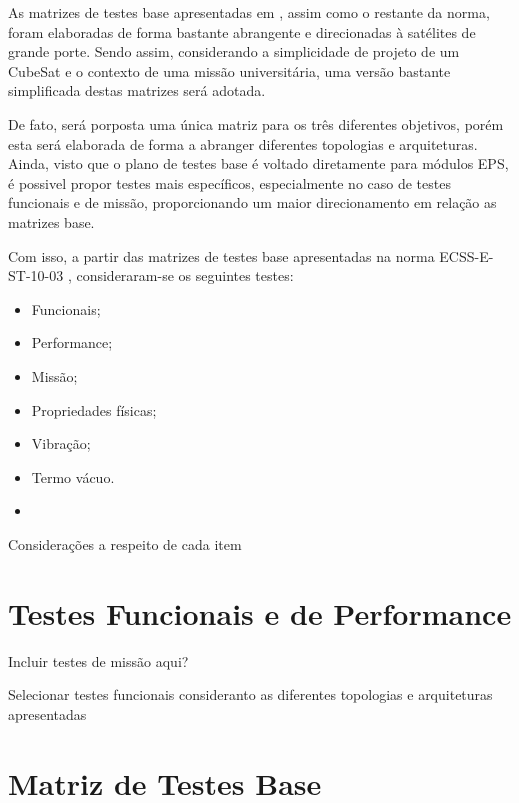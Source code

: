 As matrizes de testes base apresentadas em \textcite{ecss-e-st-10-03}, assim como o restante da norma, foram elaboradas de forma bastante abrangente e direcionadas à satélites de grande porte.
Sendo assim, considerando a simplicidade de projeto de um CubeSat e o contexto de uma missão universitária, uma versão bastante simplificada destas matrizes será adotada.

De fato, será porposta uma única matriz para os três diferentes objetivos, porém esta será elaborada de forma a abranger diferentes topologias e arquiteturas.
Ainda, visto que o plano de testes base é voltado diretamente para módulos \gls{EPS}, é possivel propor testes mais específicos, especialmente no caso de testes funcionais e de missão, proporcionando um maior direcionamento em relação as matrizes base.


Com isso, a partir das matrizes de testes base apresentadas na norma ECSS-E-ST-10-03 \cite{ecss-e-st-10-03}, consideraram-se os seguintes testes:

\begin{itemize}
    \item Funcionais;
    \item Performance;
    \item Missão;
    \item Propriedades físicas;
    \item Vibração;
    \item Termo vácuo.
    \item {}
\end{itemize}


Considerações a respeito de cada item


\section{Testes Funcionais e de Performance}

Incluir testes de missão aqui?

Selecionar testes funcionais consideranto as diferentes topologias e arquiteturas apresentadas


\section{Matriz de Testes Base}


